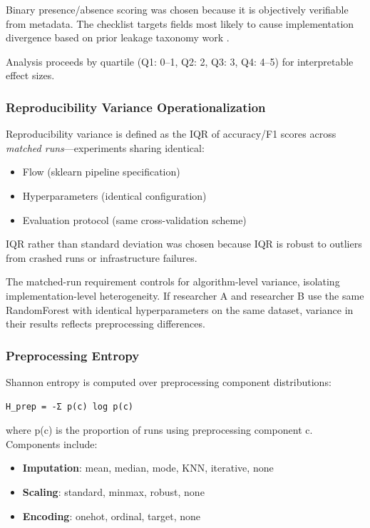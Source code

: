 Binary presence/absence scoring was chosen because it is objectively verifiable from metadata. The checklist targets fields most likely to cause implementation divergence based on prior leakage taxonomy work \citep{kapoor2022leakage}.

Analysis proceeds by quartile (Q1: 0--1, Q2: 2, Q3: 3, Q4: 4--5) for interpretable effect sizes.

\subsubsection{Reproducibility Variance Operationalization}

Reproducibility variance is defined as the IQR of accuracy/F1 scores across \textit{matched runs}---experiments sharing identical:
\begin{itemize}
\item Flow (sklearn pipeline specification)
\item Hyperparameters (identical configuration)
\item Evaluation protocol (same cross-validation scheme)
\end{itemize}

IQR rather than standard deviation was chosen because IQR is robust to outliers from crashed runs or infrastructure failures.

The matched-run requirement controls for algorithm-level variance, isolating implementation-level heterogeneity. If researcher A and researcher B use the same RandomForest with identical hyperparameters on the same dataset, variance in their results reflects preprocessing differences.

\subsubsection{Preprocessing Entropy}

Shannon entropy is computed over preprocessing component distributions:

\begin{verbatim}
H_prep = -Σ p(c) log p(c)
\end{verbatim}

where p(c) is the proportion of runs using preprocessing component c. Components include:
\begin{itemize}
\item \textbf{Imputation}: mean, median, mode, KNN, iterative, none
\item \textbf{Scaling}: standard, minmax, robust, none
\item \textbf{Encoding}: onehot, ordinal, target, none
\end{itemize}

